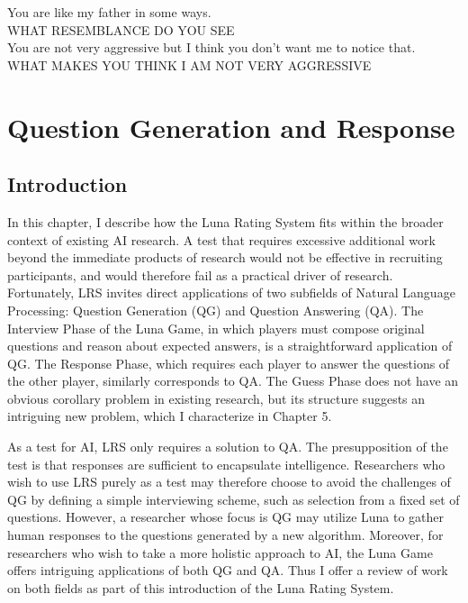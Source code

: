 \begin{savequote}[75mm]
You are like my father in some ways.\\
WHAT RESEMBLANCE DO YOU SEE\\
You are not very aggressive but I think you don't want me to notice that.\\
WHAT MAKES YOU THINK I AM NOT VERY AGGRESSIVE
\end{savequote}
\chapter{Question Generation and Response}

\section{Introduction}

In this chapter, I describe how the Luna Rating System fits within the broader context of existing AI research. A test that requires excessive additional work beyond the immediate products of research would not be effective in recruiting participants, and would therefore fail as a practical driver of research. Fortunately, LRS invites direct applications of two subfields of Natural Language Processing: Question Generation (QG) and Question Answering (QA). The Interview Phase of the Luna Game, in which players must compose original questions and reason about expected answers, is a straightforward application of QG. The Response Phase, which requires each player to answer the questions of the other player, similarly corresponds to QA. The Guess Phase does not have an obvious corollary problem in existing research, but its structure suggests an intriguing new problem, which I characterize in Chapter 5.

As a test for AI, LRS only requires a solution to QA. The presupposition of the test is that responses are sufficient to encapsulate intelligence. Researchers who wish to use LRS purely as a test may therefore choose to avoid the challenges of QG by defining a simple interviewing scheme, such as selection from a fixed set of questions. However, a researcher whose focus is QG may utilize Luna to gather human responses to the questions generated by a new algorithm. Moreover, for researchers who wish to take a more holistic approach to AI, the Luna Game offers intriguing applications of both QG and QA. Thus I offer a review of work on both fields as part of this introduction of the Luna Rating System.

